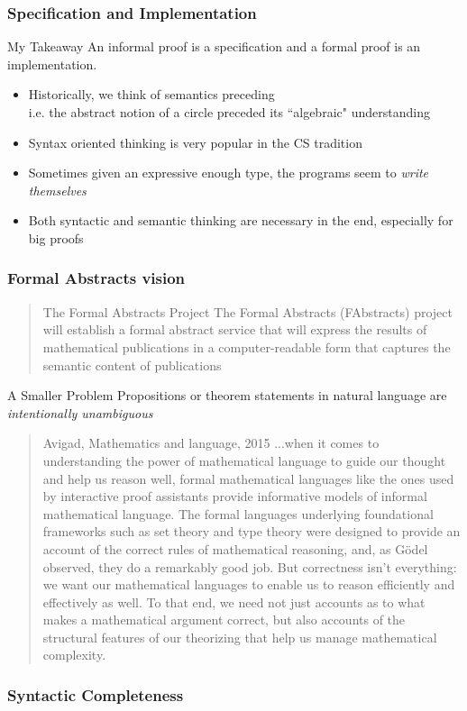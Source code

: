 \documentclass[10pt]{beamer}
\begin{document}
\begin{frame}
\frametitle{Specification and Implementation}

\begin{alertblock}{My Takeaway}
  An informal proof is a specification and a formal proof is an implementation.
\end{alertblock}

\begin{itemize}
\item Historically, we think of semantics preceding\\
  i.e. the abstract notion of a circle preceded its ``algebraic" understanding
\item Syntax oriented thinking is very popular in the CS tradition
\item Sometimes given an expressive enough type, the programs seem to \emph{write themselves}
\item Both syntactic and semantic thinking are necessary in the end, especially for big proofs

\end{itemize}
\end{frame}

\begin{frame}
\frametitle{Formal Abstracts vision}

\begin{quote}{The Formal Abstracts Project}
The Formal Abstracts (FAbstracts) project will establish a formal abstract service that will express the results of mathematical publications in a computer-readable form that captures the semantic content of publications
\end{quote}

\begin{alertblock}{A Smaller Problem}
Propositions or theorem statements in natural language are \emph{intentionally unambiguous}
\end{alertblock}
\end{frame}

\begin{frame}
\begin{quote}{Avigad, Mathematics and language, 2015}
...when it comes to understanding the power of mathematical language to guide
our thought and help us reason well, formal mathematical languages like the ones
used by interactive proof assistants provide informative models of informal
mathematical language. The formal languages underlying foundational frameworks
such as set theory and type theory were designed to provide an account of the
correct rules of mathematical reasoning, and, as Gödel observed, they do a
remarkably good job. But correctness isn’t everything: we want our mathematical
languages to enable us to reason efficiently and effectively as well. To that
end, we need not just accounts as to what makes a mathematical argument correct,
but also accounts of the structural features of our theorizing that help us
manage mathematical complexity.
\end{quote}
\end{frame}
\frametitle{Syntactic Completeness}
\end{document}
